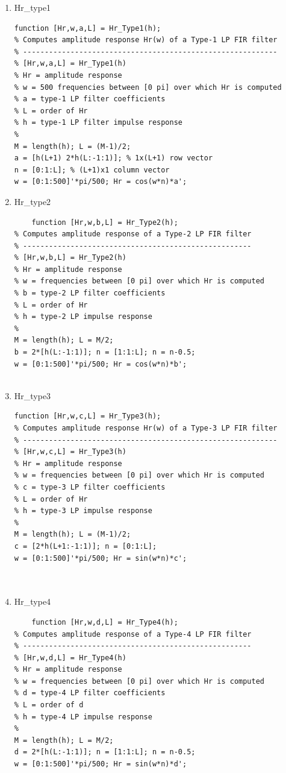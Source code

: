 \documentclass{article}
\begin{document}
\begin{enumerate}
    \item Hr\_type1
\begin{lstlisting}
function [Hr,w,a,L] = Hr_Type1(h);
% Computes amplitude response Hr(w) of a Type-1 LP FIR filter
% -----------------------------------------------------------
% [Hr,w,a,L] = Hr_Type1(h)
% Hr = amplitude response
% w = 500 frequencies between [0 pi] over which Hr is computed
% a = type-1 LP filter coefficients
% L = order of Hr
% h = type-1 LP filter impulse response
%
M = length(h); L = (M-1)/2;
a = [h(L+1) 2*h(L:-1:1)]; % 1x(L+1) row vector
n = [0:1:L]; % (L+1)x1 column vector
w = [0:1:500]'*pi/500; Hr = cos(w*n)*a';

\end{lstlisting}
    \item Hr\_type2
    \begin{lstlisting}
    function [Hr,w,b,L] = Hr_Type2(h);
% Computes amplitude response of a Type-2 LP FIR filter
% -----------------------------------------------------
% [Hr,w,b,L] = Hr_Type2(h)
% Hr = amplitude response
% w = frequencies between [0 pi] over which Hr is computed
% b = type-2 LP filter coefficients
% L = order of Hr
% h = type-2 LP impulse response
%
M = length(h); L = M/2;
b = 2*[h(L:-1:1)]; n = [1:1:L]; n = n-0.5;
w = [0:1:500]'*pi/500; Hr = cos(w*n)*b';
        
    \end{lstlisting}
    \item Hr\_type3
    \begin{lstlisting}
function [Hr,w,c,L] = Hr_Type3(h);
% Computes amplitude response Hr(w) of a Type-3 LP FIR filter
% -----------------------------------------------------------
% [Hr,w,c,L] = Hr_Type3(h)
% Hr = amplitude response
% w = frequencies between [0 pi] over which Hr is computed
% c = type-3 LP filter coefficients
% L = order of Hr
% h = type-3 LP impulse response
%
M = length(h); L = (M-1)/2;
c = [2*h(L+1:-1:1)]; n = [0:1:L];
w = [0:1:500]'*pi/500; Hr = sin(w*n)*c';

        
    \end{lstlisting}
    \item Hr\_type4
    \begin{lstlisting}
    function [Hr,w,d,L] = Hr_Type4(h);
% Computes amplitude response of a Type-4 LP FIR filter
% -----------------------------------------------------
% [Hr,w,d,L] = Hr_Type4(h)
% Hr = amplitude response
% w = frequencies between [0 pi] over which Hr is computed
% d = type-4 LP filter coefficients
% L = order of d
% h = type-4 LP impulse response
%
M = length(h); L = M/2;
d = 2*[h(L:-1:1)]; n = [1:1:L]; n = n-0.5;
w = [0:1:500]'*pi/500; Hr = sin(w*n)*d';
        
    \end{lstlisting}


\end{enumerate}
\end{document}

